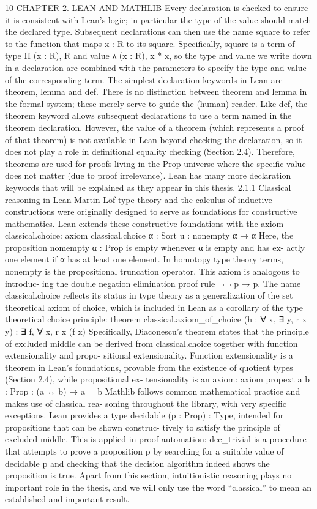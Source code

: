 \documentclass{book}
\theoremstyle{definition}
\begin{document}
10   CHAPTER 2. LEAN AND MATHLIB
Every declaration is checked to ensure it is consistent with Lean's logic; in particular the type of the value should match the declared type. Subsequent declarations can then use the name square to refer to the function that maps x : R to its square. Specifically, square is a term of type Π (x : R), R and value λ (x : R), x * x, so the type and value we write down in a declaration are combined with the parameters to specify the type and value of the corresponding term.
The simplest declaration keywords in Lean are theorem, lemma and def. There is no distinction between theorem and lemma in the formal system; these merely serve to guide the (human) reader. Like def, the theorem keyword allows subsequent declarations to use a term named in the theorem declaration. However, the value of a theorem (which represents a proof of that theorem) is not available in Lean beyond checking the declaration, so it does not play a role in definitional equality checking (Section 2.4). Therefore, theorems are used for proofs living in the Prop universe where the specific value does not matter (due to proof irrelevance). Lean has many more declaration keywords that will be explained as they appear in this thesis.
2.1.1 Classical reasoning in Lean
Martin-Löf type theory and the calculus of inductive constructions were originally designed to serve as foundations for constructive mathematics. Lean extends these constructive foundations with the axiom classical.choice:
axiom classical.choice {α : Sort u} : nonempty α → α
Here, the proposition nomempty α : Prop is empty whenever α is empty and has ex- actly one element if α has at least one element. In homotopy type theory terms, nonempty is the propositional truncation operator. This axiom is analogous to introduc- ing the double negation elimination proof rule ¬¬ p → p. The name classical.choice reflects its status in type theory as a generalization of the set theoretical axiom of choice, which is included in Lean as a corollary of the type theoretical choice principle:
theorem classical.axiom_of_choice (h : ∀ x, ∃ y, r x y) : ∃ f, ∀ x, r x (f x)
Specifically, Diaconescu's theorem states that the principle of excluded middle can be derived from classical.choice together with function extensionality and propo- sitional extensionality. Function extensionality is a theorem in Lean's foundations, provable from the existence of quotient types (Section 2.4), while propositional ex- tensionality is an axiom:
axiom propext {a b : Prop} : (a ↔ b) → a = b
Mathlib follows common mathematical practice and makes use of classical rea- soning throughout the library, with very specific exceptions. Lean provides a type decidable (p : Prop) : Type, intended for propositions that can be shown construc- tively to satisfy the principle of excluded middle. This is applied in proof automation: dec_trivial is a procedure that attempts to prove a proposition p by searching for a suitable value of decidable p and checking that the decision algorithm indeed shows the proposition is true. Apart from this section, intuitionistic reasoning plays no important role in the thesis, and we will only use the word ``classical'' to mean an established and important result.
\end{document}
